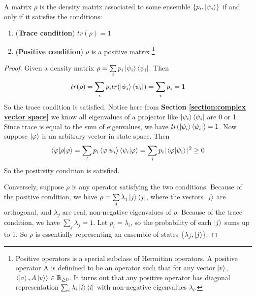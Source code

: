 \begin{theorem}\label{thm: char of density matrix}
A matrix $\rho$ is the density matrix associated to some ensemble $\{p_i, \ket{\psi_i}\}$ if and only if it satisfies the conditions:
\begin{enumerate}
    \item (\textbf{Trace condition}) $tr(\rho)=1$
    \item (\textbf{Positive condition}) $\rho$ is a positive matrix \footnote{Positive operators is a special subclass of Hermitian operators. A positive operator A is definined to be an operator such that for any vector $\ket{v}$, $\langle \ket{v}, A\ket{v} \rangle \in \mathbb{R}_{\ge 0}$. It turns out that any positive operator has diagonal representation $\sum_i \lambda_i \ket{i}\bra{i}$ with non-negative eigenvalues $\lambda_i$.} 
\end{enumerate}
\end{theorem}

\begin{proof}
Given a density matrix $\rho=\sum\limits_i p_i \ket{\psi_i}\bra{\psi_i}$. Then
\begin{equation}
    tr(\rho)=\sum_i p_i tr(\ket{\psi_i}\bra{\psi_i})=\sum_i p_i =1
\end{equation}
So the trace condition is satisfied. Notice here from \textbf{Section \ref{section:complex vector space}} we know all eigenvalues of a projector like $\ket{\psi_i}\bra{\psi_i}$ are 0 or 1. Since trace is equal to the sum of eigenvalues, we have $tr(\ket{\psi_i}\bra{\psi_i})=1$. Now suppose $\ket{\varphi}$ is an arbitrary vector in state space. Then
\begin{equation}
    \braket{\varphi|\rho|\varphi}=\sum_i p_i \braket{\varphi|\psi_i} \braket{\psi_i|\varphi}=\sum_i p_i |\braket{\varphi|\psi_i}|^2 \ge 0
\end{equation}
So the positivity condition is satisfied.

Conversely, suppose $\rho$ is any operator satisfying the two conditions. Because of the positive condition, we have $\rho=\sum\limits_j \lambda_j \ket{j}\bra{j}$, where the vectors $\ket{j}$ are orthogonal, and $\lambda_j$ are real, non-negative eigenvalues of $\rho$. Because of the trace condition, we have $\sum\limits_j \lambda_j=1$. Let $p_i=\lambda_i$, so the probability of each $\ket{j}$ sums up to 1. So $\rho$ is essentially representing an ensemble of states $\{\lambda_j, \ket{j}\}$.
\end{proof}

